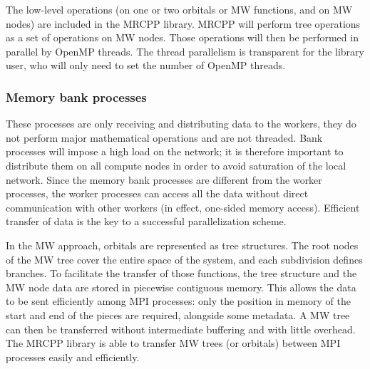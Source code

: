 \documentclass[journal=jctcce, manuscript=article]{achemso}
\begin{document}
The low-level operations (on one or two orbitals or \ac{MW} functions, and on \ac{MW} nodes) are included  in the MRCPP library. MRCPP will perform tree operations as a set of operations on \ac{MW} nodes. Those operations will then be performed in parallel by OpenMP threads. The thread parallelism is transparent for the library user, who will only need to set the number of OpenMP threads.

\subsubsection{Memory bank processes} 
These processes are only receiving and distributing data to the workers, they do not perform major mathematical operations and are not threaded. Bank processes will impose a high load on the network; it is therefore important to distribute them on all compute nodes in order to avoid saturation of the local network. Since the memory bank processes are different from the worker processes, the worker processes can access all the data without direct communication with other workers (in effect, one-sided memory access). Efficient transfer of data is the key to a successful parallelization scheme.

In the \ac{MW} approach, orbitals are represented as tree structures. The root nodes of the \ac{MW} tree cover the entire space of the system, and each subdivision defines branches. To facilitate the transfer of those functions, the tree structure and the \ac{MW} node data are stored in piecewise contiguous memory. This allows the data to be sent efficiently among MPI processes: only the position in memory of the start and end of the pieces are required, alongside some metadata. A \ac{MW} tree can then be transferred without intermediate buffering and with little overhead. 
The MRCPP library is able to transfer \ac{MW} trees (or orbitals) between \ac{MPI} processes easily and efficiently. 


\end{document}
